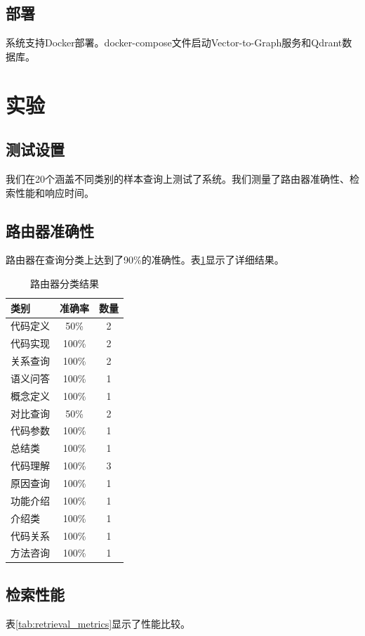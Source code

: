 \documentclass[11pt]{article}
\begin{document}
\subsection{部署}
系统支持Docker部署。docker-compose文件启动Vector-to-Graph服务和Qdrant数据库。

\section{实验}

\subsection{测试设置}
我们在20个涵盖不同类别的样本查询上测试了系统。我们测量了路由器准确性、检索性能和响应时间。

\subsection{路由器准确性}
路由器在查询分类上达到了90\%的准确性。表\ref{tab:router_results}显示了详细结果。

\begin{table}[htbp]
\centering
\caption{路由器分类结果}
\label{tab:router_results}
\begin{tabular}{lcc}
\toprule
类别 & 准确率 & 数量 \\
\midrule
代码定义 & 50\% & 2 \\
代码实现 & 100\% & 2 \\
关系查询 & 100\% & 2 \\
语义问答 & 100\% & 1 \\
概念定义 & 100\% & 1 \\
对比查询 & 50\% & 2 \\
代码参数 & 100\% & 1 \\
总结类 & 100\% & 1 \\
代码理解 & 100\% & 3 \\
原因查询 & 100\% & 1 \\
功能介绍 & 100\% & 1 \\
介绍类 & 100\% & 1 \\
代码关系 & 100\% & 1 \\
方法咨询 & 100\% & 1 \\
\bottomrule
\end{tabular}
\end{table}

\subsection{检索性能}
表\ref{tab:retrieval_metrics}显示了性能比较。
\end{document}
